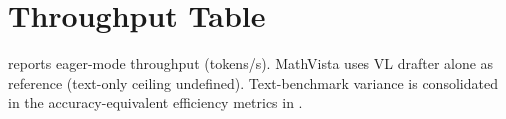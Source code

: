 \documentclass[11pt]{article}
\newcommand{\accepted}[1]{\textcolor{acceptcol}{\textbf{#1}}}
\newcommand{\fused}[1]{\textcolor{fusecol}{\textbf{#1}}}
\theoremstyle{plain}
\theoremstyle{definition}
\begin{document}


\section{Throughput Table}
\label{appx:speed}

 reports eager-mode throughput (tokens/s). MathVista uses VL drafter alone as reference (text-only ceiling undefined). Text-benchmark variance is consolidated in the accuracy-equivalent efficiency metrics in .
\end{document}
